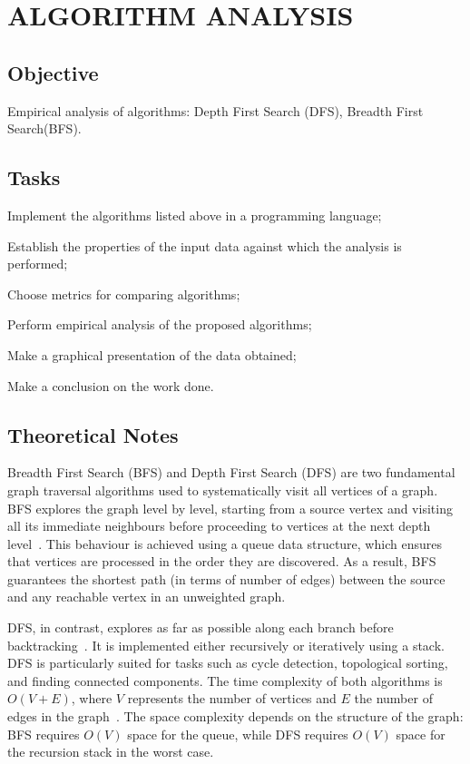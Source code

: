 \documentclass[12pt, a4paper]{report}
\begin{document}
\chapter{ALGORITHM ANALYSIS}

\section{Objective}

Empirical analysis of algorithms: Depth First Search (DFS), Breadth First Search(BFS).

\section{Tasks}


\begin{dashenum}
  \item Implement the algorithms listed above in a programming language;
  \item Establish the properties of the input data against which the analysis is performed;
  \item Choose metrics for comparing algorithms;
  \item Perform empirical analysis of the proposed algorithms;
  \item Make a graphical presentation of the data obtained;
  \item Make a conclusion on the work done.
\end{dashenum}

\section{Theoretical Notes}

Breadth First Search (BFS) and Depth First Search (DFS) are two fundamental
graph traversal algorithms used to systematically visit all vertices of a graph.
BFS explores the graph level by level, starting from a source vertex and visiting
all its immediate neighbours before proceeding to vertices at the next depth
level~\cite{ref:bfs}. This behaviour is achieved using a queue data structure,
which ensures that vertices are processed in the order they are discovered.
As a result, BFS guarantees the shortest path (in terms of number of edges)
between the source and any reachable vertex in an unweighted graph.

DFS, in contrast, explores as far as possible along each branch before
backtracking~\cite{ref:dfs}. It is implemented either recursively or
iteratively using a stack. DFS is particularly suited for tasks such as
cycle detection, topological sorting, and finding connected components.
The time complexity of both algorithms is $O(V + E)$, where $V$ represents
the number of vertices and $E$ the number of edges in the graph~\cite{ref:yt}.
The space complexity depends on the structure of the graph: BFS requires
$O(V)$ space for the queue, while DFS requires $O(V)$ space for the
recursion stack in the worst case.
\end{document}
